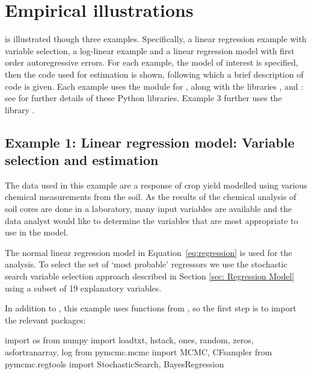 \documentclass[article]{jss}
\begin{document}
\section{Empirical illustrations}
\label{sec:Empirical-Illustrations}

 is illustrated though three examples. Specifically, a
linear regression example with variable selection, a log-linear
example and a linear regression model with first order autoregressive
errors.  For each example, the model of interest is specified, then
the code used for estimation is shown, following which a brief
description of code is given. Each example uses the module for
, along with the  libraries ,
 and : see \citet{NumpyScipy, Matplotlib}
for further details of these Python libraries.  Example 3 further uses
the library  \citep{geus11}.


\subsection{Example 1: Linear regression model: Variable selection and
  estimation}

The data used in this example are a response of crop yield modelled
using various chemical measurements from the soil. As the results of
the chemical analysis of soil cores are done in a laboratory, many
input variables are available and the data analyst would like to
determine the variables that are most appropriate to use in the model.

The normal linear regression model in Equation~\ref{eq:regression} is used
for the analysis.  To select the set of `most probable'
regressors we use the stochastic search variable selection approach
described in Section \ref{sec: Regression Model} using a subset of 19
explanatory variables.


In addition to , this example uses functions from
, so the first step is to import the relevant packages:

\begin{Code}
import os
from numpy import loadtxt, hstack, ones, random, zeros, asfortranarray, log
from pymcmc.mcmc import MCMC, CFsampler
from pymcmc.regtools import StochasticSearch, BayesRegression
\end{Code}
\end{document}
